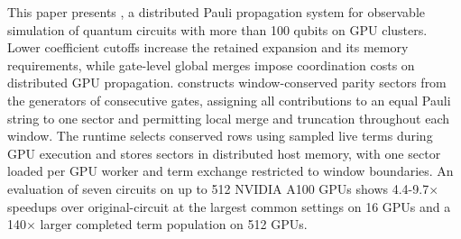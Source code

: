 This paper presents \SectorQ, a distributed Pauli propagation system for observable simulation of quantum circuits with more than 100 qubits on GPU clusters.
Lower coefficient cutoffs increase the retained expansion and its memory requirements, while gate-level global merges impose coordination costs on distributed GPU propagation.
\SectorQ constructs window-conserved parity sectors from the generators of consecutive gates, assigning all contributions to an equal Pauli string to one sector and permitting local merge and truncation throughout each window.
The runtime selects conserved rows using sampled live terms during GPU execution and stores sectors in distributed host memory, with one sector loaded per GPU worker and term exchange restricted to window boundaries.
An evaluation of seven circuits on up to 512 NVIDIA A100 GPUs shows 4.4-9.7$\times$ speedups over original-circuit \cuPP at the largest common settings on 16 GPUs and a 140$\times$ larger completed term population on 512 GPUs.
